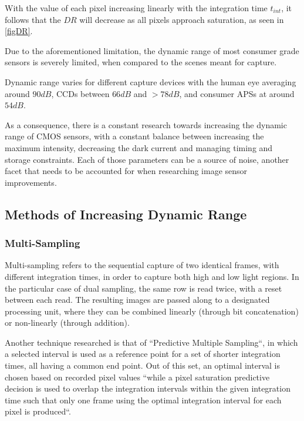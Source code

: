 With the value of each pixel increasing linearly with the integration time \(t_{int}\), it follows that the \(DR\) will decrease as all pixels 
approach saturation, as seen in \ref{figDR}. \cite{stanford}

Due to the aforementioned limitation, the dynamic range of most consumer grade sensors is severely limited, 
when compared to the scenes meant for capture.

Dynamic range varies for different capture devices with the human eye averaging around \(90dB\), 
CCDs between \(66dB\) and \(>78dB\), and consumer APSs at around \(54dB\). \cite{stanford}

As a consequence, there is a constant research towards increasing the dynamic range of CMOS sensors, with a constant
balance between increasing the maximum intensity, decreasing the dark current and managing timing and storage
constraints. Each of those parameters can be a source of noise, another facet that needs to be accounted
for when researching image sensor improvements.

\subsection{Methods of Increasing Dynamic Range}

\subsubsection{Multi-Sampling}

Multi-sampling refers to the sequential capture of two identical frames, with different integration times, in order
to capture both high and low light regions. In the particular case of dual sampling, the same row is read twice,
with a reset between each read. The resulting images are passed along to a designated processing unit, where
they can be combined linearly (through bit concatenation) or non-linearly (through addition). \cite{withSampling}

Another technique researched is that of ``Predictive Multiple Sampling``, in which a selected interval is
used as a reference point for a set of shorter integration times, all having a common end point. Out of this set,
an optimal interval is chosen based on recorded pixel values ``while a pixel saturation predictive decision 
is used to overlap the integration intervals within the given integration time such that only one frame 
using the optimal integration interval for each pixel is produced``. \cite{withPredictive}


